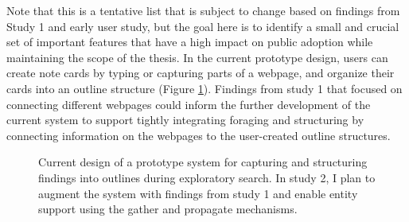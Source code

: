Note that this is a tentative list that is subject to change based on findings from Study 1 and early user study, but the goal here is to identify a small and crucial set of important features that have a high impact on public adoption while maintaining the scope of the thesis. 
In the current prototype design, users can create note cards by typing or capturing parts of a webpage, and organize their cards into an outline structure (Figure \ref{fig:screenshot}). Findings from study 1 that focused on connecting different webpages could inform the further development of the current system to support tightly integrating foraging and structuring by connecting information on the webpages to the user-created outline structures.


\begin{figure}
    \centering
    \caption{Current design of a prototype system for capturing and structuring findings into outlines during exploratory search. In study 2, I plan to augment the system with findings from study 1 and enable entity support using the gather and propagate mechanisms.}
    \label{fig:screenshot}
\end{figure}